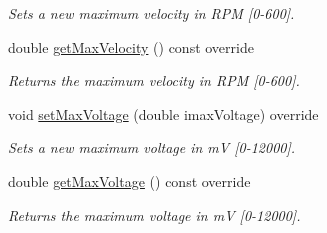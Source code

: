 \begin{DoxyCompactItemize}
\begin{DoxyCompactList}\small\item\em Sets a new maximum velocity in R\+PM \mbox{[}0-\/600\mbox{]}. \end{DoxyCompactList}\item 
double \mbox{\hyperlink{classokapi_1_1MockChassisModel_a01cc886c9187f9b9344933c4755811f0}{get\+Max\+Velocity}} () const override
\begin{DoxyCompactList}\small\item\em Returns the maximum velocity in R\+PM \mbox{[}0-\/600\mbox{]}. \end{DoxyCompactList}\item 
void \mbox{\hyperlink{classokapi_1_1MockChassisModel_a3876a1624830f5bcd7565e2ea7465ab9}{set\+Max\+Voltage}} (double imax\+Voltage) override
\begin{DoxyCompactList}\small\item\em Sets a new maximum voltage in mV \mbox{[}0-\/12000\mbox{]}. \end{DoxyCompactList}\item 
double \mbox{\hyperlink{classokapi_1_1MockChassisModel_a68e0317d444b60f14617acfc3e242ad1}{get\+Max\+Voltage}} () const override
\begin{DoxyCompactList}\small\item\em Returns the maximum voltage in mV \mbox{[}0-\/12000\mbox{]}. \end{DoxyCompactList}\end{DoxyCompactItemize}
